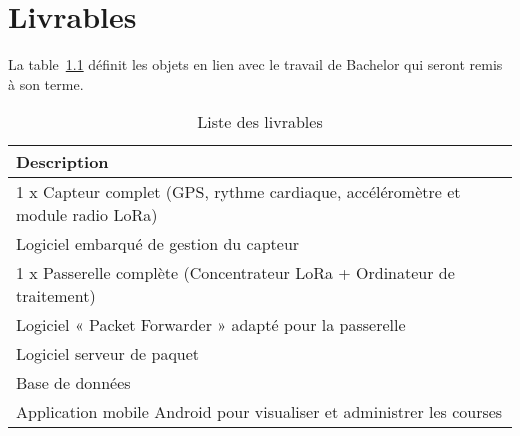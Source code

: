 
\chapter{Livrables}

La table~\ref{tab:livrables}  définit les objets en lien avec le travail de Bachelor qui seront remis à son terme.

\begin{table}[htb]
\caption[Livrable]{Liste des livrables}
\label{tab:livrables}
\centering
\begin{tabular}{l}
\toprule
Description \\
\midrule
1 x Capteur complet (GPS, rythme cardiaque, accéléromètre et module radio LoRa)  \\
Logiciel embarqué de gestion du capteur \\
1 x Passerelle complète (Concentrateur LoRa + Ordinateur de traitement) \\
Logiciel « Packet Forwarder » adapté pour la passerelle \\
Logiciel serveur de paquet \\
Base de données \\
Application mobile Android pour visualiser et administrer les courses \\
\bottomrule 
\end{tabular}
\end{table}